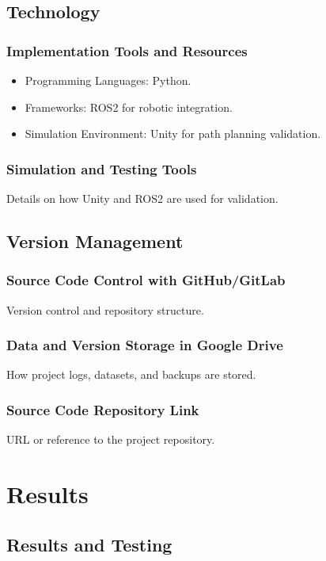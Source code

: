 \documentclass[a4paper,12pt]{report}
\begin{document}
\section{Technology}
\subsection{Implementation Tools and Resources}
\begin{itemize}
    \item Programming Languages: Python.
    \item Frameworks: ROS2 for robotic integration.
    \item Simulation Environment: Unity for path planning validation.
\end{itemize}

\subsection{Simulation and Testing Tools}
Details on how Unity and ROS2 are used for validation.

\section{Version Management}
\subsection{Source Code Control with GitHub/GitLab}
Version control and repository structure.

\subsection{Data and Version Storage in Google Drive}
How project logs, datasets, and backups are stored.

\subsection{Source Code Repository Link}
URL or reference to the project repository.

\newpage

\chapter{Results}
\section{Results and Testing}
\end{document}
